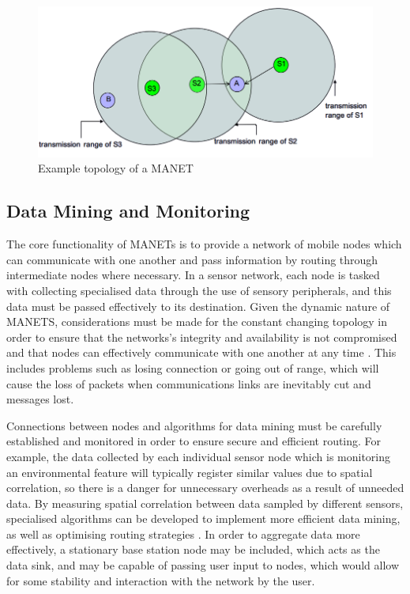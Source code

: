 \begin{figure}
\centering	
\includegraphics[width=\textwidth]{img/manet}	
\caption{Example topology of a MANET}
\end{figure}

\subsection{Data Mining and Monitoring}
The core functionality of MANETs is to provide a network of mobile nodes which can communicate with one another and pass information by routing through intermediate nodes where necessary. In a sensor network, each node is tasked with collecting specialised data through the use of sensory peripherals, and this data must be passed effectively to its destination. Given the dynamic nature of MANETS, considerations must be made for the constant changing topology in order to ensure that the networks's integrity and availability is not compromised and that nodes can effectively communicate with one another at any time \cite{ramramathanjasonredi2012}. This includes problems such as losing connection or going out of range, which will cause the loss of packets when communications links are inevitably cut and messages lost. 

Connections between nodes and algorithms for data mining must be carefully established and monitored in order to ensure secure and efficient routing. For example, the data collected by each individual sensor node which is monitoring an environmental feature will typically register similar values due to spatial correlation, so there is a danger for unnecessary overheads as a result of unneeded data. By measuring spatial correlation between data sampled by different sensors, specialised algorithms can be developed to implement more efficient data mining, as well as optimising routing strategies \cite{mayajie2011}. In order to aggregate data more effectively, a  stationary base station node may be included, which acts as the data sink, and may be capable of passing user input to nodes, which would allow for some stability and interaction with the network by the user. 

